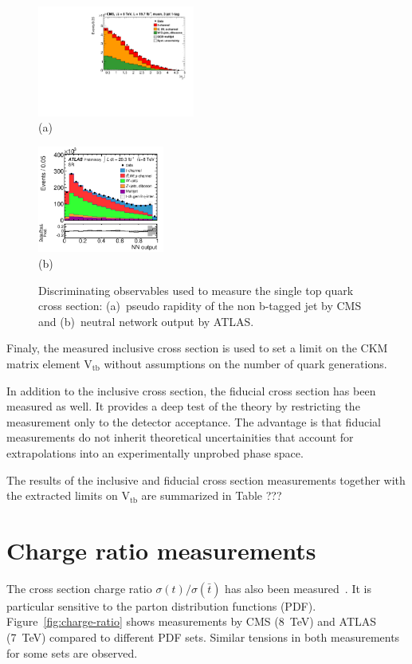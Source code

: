 \documentclass{PoS}
\begin{document}
\begin{figure}[htbp]
\begin{center}
\parbox[t]{0.5\textwidth}{\centering\includegraphics[width=0.46\textwidth]{cms_xsec8/etamuon.pdf}\\(a)}
\parbox[t]{0.42\textwidth}{\centering\includegraphics[width=0.37\textwidth]{atlas_xsec8/nnoutput.pdf}\\(b)}

\end{center}
\caption{\label{fig:fit-xsec-8}Discriminating observables used to measure the single top quark cross section: (a)~pseudo rapidity of the non b-tagged jet by CMS and (b)~neutral network output by ATLAS.}

\end{figure}

Finaly, the measured inclusive cross section is used to set a limit on the CKM matrix element $\mathrm{V_{tb}}$ without assumptions on the number of quark generations.

In addition to the inclusive cross section, the fiducial cross section has been measured as well. It provides a deep test of the theory by restricting the measurement only to the detector acceptance. The advantage is that fiducial measurements do not inherit theoretical uncertainities that account for extrapolations into an experimentally unprobed phase space.


The results of the inclusive and fiducial cross section measurements together with the extracted limits on $\mathrm{V_{tb}}$ are summarized in Table ???


\section{Charge ratio measurements}
The cross section charge ratio $\sigma(t)/\sigma(\bar{t})$ has also been measured~\cite{atlas-charge7,cms-xsec8}. It is particular sensitive to the parton distribution functions (PDF). Figure~\ref{fig:charge-ratio} shows measurements by CMS (8~TeV) and ATLAS (7~TeV) compared to different PDF sets. Similar tensions in both measurements for some sets are observed. 
\end{document}
